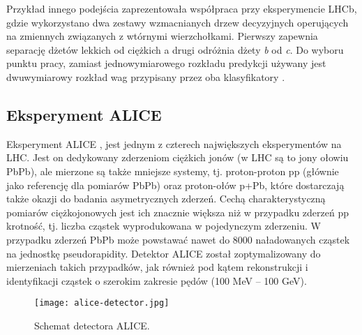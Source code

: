 Przykład innego podejścia zaprezentowała współpraca przy eksperymencie LHCb, gdzie wykorzystano dwa zestawy wzmacnianych drzew decyzyjnych operujących na zmiennych związanych z wtórnymi wierzchołkami. Pierwszy zapewnia separację dżetów lekkich od ciężkich a drugi odróżnia dżety \textit{b} od \textit{c}. 
Do wyboru punktu pracy, zamiast jednowymiarowego rozkładu predykcji używany jest dwuwymiarowy rozkład wag przypisany przez oba klasyfikatory \cite{Aaij:2015yqa}.


\subsection{Eksperyment ALICE}

Eksperyment ALICE \cite{Aamodt:2008zz}, \cite{Abelev:2014ffa} jest jednym z czterech największych eksperymentów na LHC. Jest on dedykowany zderzeniom ciężkich jonów (w LHC są to jony ołowiu PbPb), ale mierzone są także mniejsze systemy, tj. proton-proton pp (głównie jako referencję dla pomiarów PbPb) oraz proton-ołów p+Pb, które dostarczają także okazji do badania asymetrycznych zderzeń. Cechą charakterystyczną pomiarów ciężkojonowych jest ich znacznie większa niż w przypadku zderzeń pp krotność, tj. liczba cząstek wyprodukowana w pojedynczym zderzeniu. W przypadku zderzeń PbPb może powstawać nawet do 8000 naładowanych cząstek na jednostkę pseudorapidity. Detektor ALICE został zoptymalizowany do mierzeniach takich przypadków, jak również pod kątem rekonstrukcji i identyfikacji cząstek o szerokim zakresie pędów (100 MeV -- 100 GeV).


\begin{figure}[h]
	\centering
	\texttt{[image: alice-detector.jpg]}
	\caption{Schemat detectora ALICE.}
	\label{fig:alice-detector}
\end{figure}


